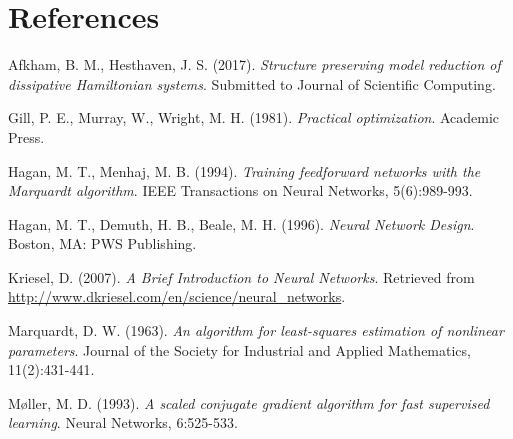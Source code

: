 \documentclass[longtitle]{elsarticle}
\theoremstyle{theorem}
\theoremstyle{definition}
\theoremstyle{remark}
\theoremstyle{proposition}
\numberwithin{figure}{section}
\begin{document}
	\section*{References}
	\begin{thebibliography}{50}
		Afkham, B. M., Hesthaven, J. S. (2017). \emph{Structure preserving model reduction of dissipative Hamiltonian systems}. Submitted to Journal of Scientific Computing.

		Gill, P. E., Murray, W., Wright, M. H. (1981). \emph{Practical optimization}. Academic Press.

		Hagan, M. T., Menhaj, M. B. (1994). \emph{Training feedforward networks with the Marquardt algorithm}. IEEE Transactions on Neural Networks, 5(6):989-993.

		Hagan, M. T., Demuth, H. B., Beale, M. H. (1996). \emph{Neural Network Design}. Boston, MA: PWS Publishing.		

		Kriesel, D. (2007). \emph{A Brief Introduction to Neural Networks}. Retrieved from \url{http://www.dkriesel.com/en/science/neural_networks}.

		Marquardt, D. W. (1963). \emph{An algorithm for least-squares estimation of nonlinear parameters}. Journal of the Society for Industrial and Applied Mathematics, 11(2):431-441.

		M\o{}ller, M. D. (1993). \emph{A scaled conjugate gradient algorithm for fast supervised learning}. Neural Networks, 6:525-533.
	\end{thebibliography}
\end{document}
